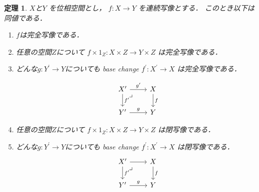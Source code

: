 \documentclass[leqno, a4paper, 12pt, dvipdfmx]{jsarticle}
\newtheorem{thm}{定理}
\begin{document}
\begin{thm}\label{thm:main1}
$X$と$Y$
を位相空間とし，
$f\colon X\to Y$
を連続写像とする．
このとき以下は同値である．
\begin{enumerate}[label=\textup{(P\arabic*)}]
\item\label{item:perfectmain1}
$f$は完全写像である．
\item\label{item:uniper}
任意の空間$Z$について
$f\times 1_{Z}\colon X\times Z\to Y\times Z$
は完全写像である．

\item\label{item:bcper}
どんな$g\colon Y^{\prime}\to Y$についても
base change $f^{\prime}\colon X^{\prime}\to X$
は完全写像である．


\[
\begin{tikzcd}
X^{\prime} \arrow[r, "g^{\prime}"] \arrow[d, "f^{\prime}"] \arrow[dr, phantom, "\lrcorner", very near start]
& X \arrow[d,"f"] \\
Y^{\prime} \arrow[r,"g"] & Y
\end{tikzcd}
\]



\item\label{item:uniclo}
任意の空間$Z$について
$f\times 1_{Z}\colon X\times Z\to Y\times Z$
は閉写像である．

\item\label{item:bcclo}
どんな$g\colon Y^{\prime}\to Y$についても
base change $f^{\prime}\colon X^{\prime}\to X$
は閉写像である．
\[
\begin{tikzcd}
X^{\prime} \arrow[r] \arrow[d, "f^{\prime}"] \arrow[dr, phantom, "\lrcorner", very near start]
& X \arrow[d,"f"] \\
Y^{\prime} \arrow[r,"g"] & Y
\end{tikzcd}
\]





\end{enumerate}
\end{thm}
\end{document}
